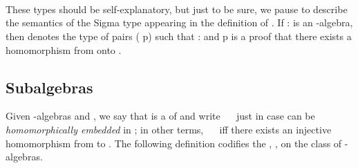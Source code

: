 \begin{code}
%
\\[\AgdaEmptyExtraSkip]%
\>[0]\AgdaSpace{}%
\AgdaSymbol{:}\AgdaSpace{}%
\AgdaSymbol{\{}\AgdaSpace{}%
\AgdaSymbol{:}\AgdaSpace{}%
\AgdaSpace{}%
\AgdaSpace{}%
\AgdaSymbol{\}}\AgdaSpace{}%
\AgdaSpace{}%
\AgdaSpace{}%
\AgdaSpace{}%
\<%
\\
\>[0]\AgdaSpace{}%
\AgdaSymbol{\{}\AgdaSpace{}%
\AgdaSymbol{=}\AgdaSpace{}%
\AgdaSymbol{\}\{}\AgdaSpace{}%
\AgdaSymbol{=}\AgdaSpace{}%
\AgdaSymbol{\}}\AgdaSpace{}%
\AgdaSymbol{=}\AgdaSpace{}%
\AgdaSpace{}%
\AgdaOperator{\AgdaInductiveConstructor{,}}\AgdaSpace{}%
\AgdaSpace{}%
\AgdaSymbol{\{}\AgdaSymbol{\}}\AgdaSpace{}%
\AgdaSpace{}%
\AgdaSpace{}%
\AgdaSpace{}%
\<%
\\
\>[0][@{}l@{\AgdaIndent{0}}]%
\>[1]\AgdaSpace{}%
\AgdaSpace{}%
\AgdaSpace{}%
\AgdaOperator{\AgdaFunction{𝔻[}}\AgdaSpace{}%
\AgdaSpace{}%
\AgdaOperator{\AgdaFunction{]}}\AgdaSpace{}%
\AgdaSpace{}%
\AgdaSymbol{(}\AgdaSpace{}%
\AgdaSpace{}%
\AgdaSymbol{)}\<%
\end{code}
\ifshort\else    %

\medskip

\noindent These types should be self-explanatory, but just to be sure, we pause
to describe the semantics of the Sigma type appearing in the definition of .
If  :    is an -algebra, then  
denotes the type of pairs ( \aic{,} \ab p) such that  :   
and \ab p is a proof that there exists a homomorphism from  onto .
\fi      %

\subsection{Subalgebras}
\label{subalgebras}
Given -algebras  and , we say that  is a  of
 and write ~~ just in case  can be \emph{homomorphically
embedded} in ; in other terms, ~~ iff there exists an injective
homomorphism from  to . The following definition codifies the , , on the class of -algebras.

